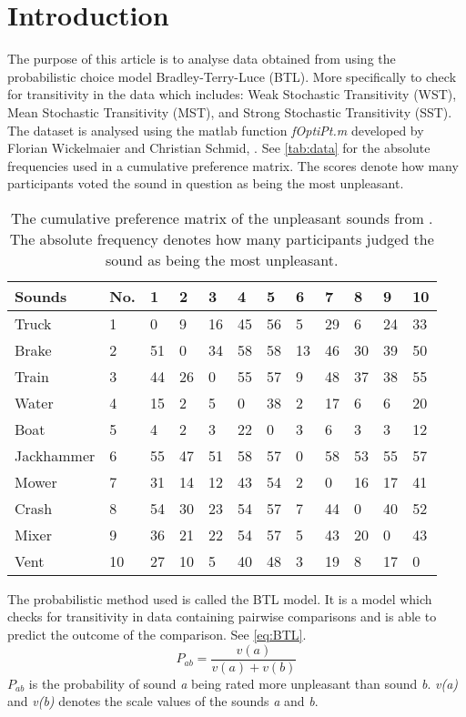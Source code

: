 \section*{Introduction}
\label{Introduktion}
%
The purpose of this article is to analyse data obtained from \textcite{Ellermeier2004} using the probabilistic choice model Bradley-Terry-Luce (BTL). More specifically to check for transitivity in the data which includes: Weak Stochastic Transitivity (WST), Mean Stochastic Transitivity (MST), and Strong Stochastic Transitivity (SST). The dataset is analysed using the matlab function \textit{fOptiPt.m} developed by Florian Wickelmaier and Christian Schmid, \parencite{Wickelmaier2004}. See \autoref{tab:data} for the absolute frequencies used in a cumulative preference matrix. The scores denote how many participants voted the sound in question as being the most unpleasant.
%
\begin{table}[H]
\centering
\begin{tabular}{@{}llllllllllll@{}}
\toprule
Sounds     & No. & 1  & 2  & 3  & 4  & 5  & 6  & 7  & 8  & 9  & 10 \\ \midrule
Truck      & 1   & 0  & 9  & 16 & 45 & 56 & 5  & 29 & 6  & 24 & 33 \\
Brake      & 2   & 51 & 0  & 34 & 58 & 58 & 13 & 46 & 30 & 39 & 50 \\
Train      & 3   & 44 & 26 & 0  & 55 & 57 & 9  & 48 & 37 & 38 & 55 \\
Water      & 4   & 15 & 2  & 5  & 0  & 38 & 2  & 17 & 6  & 6  & 20 \\
Boat       & 5   & 4  & 2  & 3  & 22 & 0  & 3  & 6  & 3  & 3  & 12 \\
Jackhammer & 6   & 55 & 47 & 51 & 58 & 57 & 0  & 58 & 53 & 55 & 57 \\
Mower      & 7   & 31 & 14 & 12 & 43 & 54 & 2  & 0  & 16 & 17 & 41 \\
Crash      & 8   & 54 & 30 & 23 & 54 & 57 & 7  & 44 & 0  & 40 & 52 \\
Mixer      & 9   & 36 & 21 & 22 & 54 & 57 & 5  & 43 & 20 & 0  & 43 \\
Vent       & 10  & 27 & 10 & 5  & 40 & 48 & 3  & 19 & 8  & 17 & 0  \\ \bottomrule
\end{tabular}
\caption{The cumulative preference matrix of the unpleasant sounds from \textcite{Ellermeier2004}. The absolute frequency denotes how many participants judged the sound as being the most unpleasant.}
\label{tab:data}
\end{table} 
\noindent 
%
The probabilistic method used is called the BTL model. It is a model which checks for transitivity in data containing pairwise comparisons and is able to predict the outcome of the comparison. See \autoref{eq:BTL}.
%
\begin{equation}
P_{ab} =\frac{v(a)}{v(a)+v(b)} 
\label{eq:BTL}
\end{equation}
%
$P_{ab}$ is the probability of sound \textit{a} being rated more unpleasant than sound \textit{b}. \textit{v(a)} and \textit{v(b)} denotes the scale values of the sounds \textit{a} and \textit{b}.

